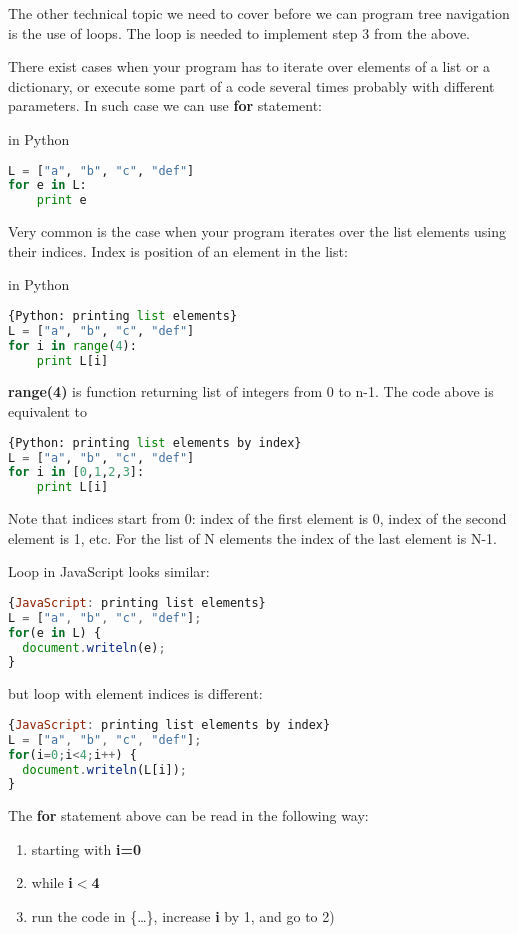 The other technical topic we need to cover before we can program
tree navigation is the use of loops. The loop is needed to implement
step 3 from the above.

There exist cases when your program has to iterate over elements
of a list or a dictionary, or execute some part of a code several times
probably with different parameters. In such case we can use \textbf{for}
statement:

in Python
\begin{lstlisting}[style=codelst,language=Python]
L = ["a", "b", "c", "def"]
for e in L:
    print e
\end{lstlisting}

Very common is the case when your program iterates over the
list elements using their indices. Index is position of an element
in the list:

in Python
\begin{lstlisting}[style=codelst,language=Python]{Python: printing list elements}
L = ["a", "b", "c", "def"]
for i in range(4):
    print L[i]
\end{lstlisting}

\textbf{range(4)} is function returning list of integers from 0 to n-1.
The code above is equivalent to
\begin{lstlisting}[style=codelst,language=Python]{Python: printing list elements by index}
L = ["a", "b", "c", "def"]
for i in [0,1,2,3]:
    print L[i]
\end{lstlisting}
Note that indices start from 0: index of the first element is 0, index of
the second element is 1, etc. For the list of N elements the index of the last element
is N-1.

Loop in JavaScript looks similar:
\begin{lstlisting}[style=codelst,language=JavaScript]{JavaScript: printing list elements}
L = ["a", "b", "c", "def"];
for(e in L) {
  document.writeln(e);
}
\end{lstlisting}
but loop with element indices is different:
\begin{lstlisting}[style=codelst,language=JavaScript]{JavaScript: printing list elements by index}
L = ["a", "b", "c", "def"];
for(i=0;i<4;i++) {
  document.writeln(L[i]);
}
\end{lstlisting}

The \textbf{for} statement above can be read in the following way:
\begin{leftborder}
\begin{enumerate}
\item starting with \textbf{i=0}
\item while \textbf{i$<$4}
\item run the code in \{\dots\}, increase \textbf{i} by 1, and go to 2)
\end{enumerate}
\end{leftborder}

